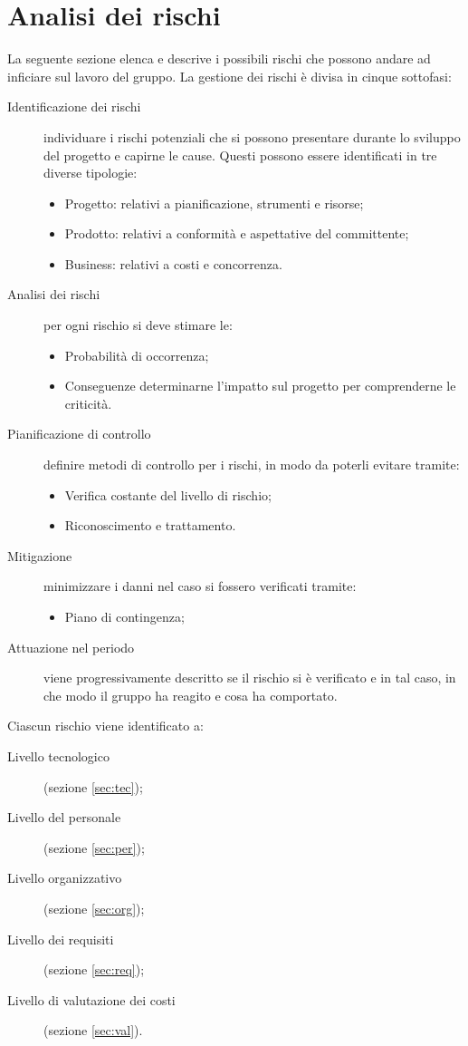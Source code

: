 \newpage \section{Analisi dei rischi} \label{sec:analisi}
La seguente sezione elenca e descrive i possibili rischi che possono andare ad inficiare sul lavoro del gruppo.
La gestione dei rischi è divisa in cinque sottofasi:
\begin{description}
	\item[Identificazione dei rischi] individuare i rischi potenziali che si possono presentare durante lo sviluppo del progetto e capirne le cause. Questi possono essere identificati in tre diverse tipologie:
	\begin{itemize}
		\item Progetto: relativi a pianificazione, strumenti e risorse;
		\item Prodotto: relativi a conformità e aspettative del committente;
		\item Business: relativi a costi e concorrenza.
	\end{itemize}
	\item[Analisi dei rischi] per ogni rischio si deve stimare le:
	\begin{itemize}
		\item Probabilità di occorrenza;
		\item Conseguenze determinarne l'impatto sul progetto per comprenderne le criticità.
	\end{itemize}
	\item[Pianificazione di controllo] definire metodi di controllo per i rischi, in modo da poterli evitare tramite:
	\begin{itemize}
		\item Verifica costante del livello di rischio;
		\item Riconoscimento e trattamento.
	\end{itemize}
	\item[Mitigazione] minimizzare i danni nel caso si fossero verificati tramite:
	\begin{itemize}
		\item Piano di contingenza;
	\end{itemize}
	\item[Attuazione nel periodo] viene progressivamente descritto se il rischio si è verificato e in tal caso, in che modo il gruppo ha reagito e cosa ha comportato.
\end{description}
Ciascun rischio viene identificato a:
\begin{description}
	\item[Livello tecnologico](sezione \ref{sec:tec});
	\item[Livello del personale](sezione \ref{sec:per});
	\item[Livello organizzativo](sezione \ref{sec:org});
	\item[Livello dei requisiti](sezione \ref{sec:req});
	\item[Livello di valutazione dei costi](sezione \ref{sec:val}).
\end{description}
